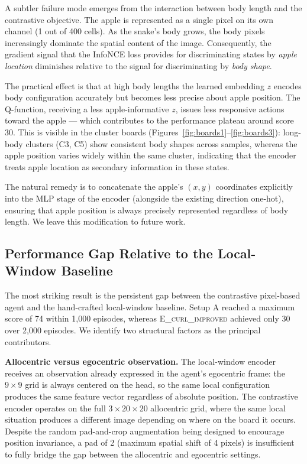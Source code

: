 \documentclass[11pt]{article}
\begin{document}
A subtler failure mode emerges from the interaction between body length and
the contrastive objective.
The apple is represented as a single pixel on its own channel (1 out of 400
cells).
As the snake's body grows, the body pixels increasingly dominate the spatial
content of the image.
Consequently, the gradient signal that the InfoNCE loss provides for
discriminating states by \emph{apple location} diminishes relative to the
signal for discriminating by \emph{body shape}.

The practical effect is that at high body lengths the learned embedding $z$
encodes body configuration accurately but becomes less precise about apple
position.
The Q-function, receiving a less apple-informative $z$, issues less
responsive actions toward the apple — which contributes to the performance
plateau around score 30.
This is visible in the cluster boards (Figures~\ref{fig:boards1}--\ref{fig:boards3}):
long-body clusters (C3, C5) show consistent body shapes across samples,
whereas the apple position varies widely within the same cluster, indicating
that the encoder treats apple location as secondary information in these states.

The natural remedy is to concatenate the apple's $(x, y)$ coordinates
explicitly into the MLP stage of the encoder (alongside the existing
direction one-hot), ensuring that apple position is always precisely
represented regardless of body length.
We leave this modification to future work.

\subsection{Performance Gap Relative to the Local-Window Baseline}

The most striking result is the persistent gap between the contrastive
pixel-based agent and the hand-crafted local-window baseline.
Setup A reached a maximum score of 74 within 1{,}000 episodes, whereas
\textsc{E\_curl\_improved} achieved only 30 over 2{,}000 episodes.
We identify two structural factors as the principal contributors.

\textbf{Allocentric versus egocentric observation.}
The local-window encoder receives an observation already expressed in the
agent's egocentric frame: the $9\times9$ grid is always centered on the head,
so the same local configuration produces the same feature vector regardless
of absolute position.
The contrastive encoder operates on the full $3\times20\times20$ allocentric
grid, where the same local situation produces a different image depending on
where on the board it occurs.
Despite the random pad-and-crop augmentation being designed to encourage
position invariance, a pad of 2 (maximum spatial shift of 4 pixels) is
insufficient to fully bridge the gap between the allocentric and egocentric
settings.
\end{document}
